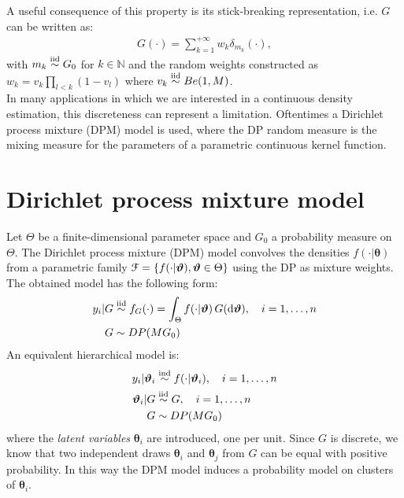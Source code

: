 A useful consequence of this property is its stick-breaking representation, i.e. $G$ can be written as:
\begin{align*}
	G(\cdot) = \sum_{k=1}^{+\infty} w_k \delta_{m_k} (\cdot),
\end{align*}
with $m_k \stackrel{\text{iid}}{\sim} G_0$ for $k\in\mathbb{N}$ and the random weights constructed as $w_k =v_k\prod\limits_{l<k} (1-v_l)$ where $v_k \stackrel{\text{iid}}{\sim} Be(1,M)$. \\
In many applications in which we are interested in a continuous density estimation, this discreteness can represent a limitation.
Oftentimes a Dirichlet process mixture (DPM) model is used, where the DP random measure is the mixing measure for the parameters of a parametric continuous kernel function.

\section{Dirichlet process mixture model}
Let $\Theta$ be a finite-dimensional parameter space and $G_0$ a probability measure on $\Theta$.
The Dirichlet process mixture (DPM) model convolves the densities $f(\cdot|\boldsymbol\theta)$ from a parametric family $\mathcal F = \{f(\cdot|\boldsymbol{\vartheta}), \boldsymbol{\vartheta} \in \Theta \}$ using the DP as mixture weights.
The obtained model has the following form:
\begin{equation}
	\begin{aligned}\label{dpm-1}
	y_i | G &\stackrel{\text{iid}}{\sim} f_G(\cdot) = \int_\Theta f(\cdot|\boldsymbol{\vartheta}) \, G(\mathrm d\boldsymbol{\vartheta}), \quad i=1,\dots,n \\
	G &\sim DP(M G_0)
	\end{aligned}
\end{equation}
An equivalent hierarchical model is:
\begin{equation}
	\begin{aligned}\label{dpm-2}
	y_i | \boldsymbol{\vartheta}_i &\stackrel{\text{ind}}{\sim} f(\cdot|\boldsymbol{\vartheta}_i), \quad i=1,\dots,n \\
	\boldsymbol{\vartheta}_i | G &\stackrel{\text{iid}}{\sim} G, \quad i=1,\dots,n \\ 
	G &\sim DP(M G_0)
	\end{aligned}
\end{equation}
where the \emph{latent variables} $\boldsymbol\theta_i$ are introduced, one per unit.
Since $G$ is discrete, we know that two independent draws $\boldsymbol\theta_i$ and $\boldsymbol\theta_j$ from $G$ can be equal with positive probability.
In this way the DPM model induces a probability model on clusters of $\boldsymbol\theta_i$.
